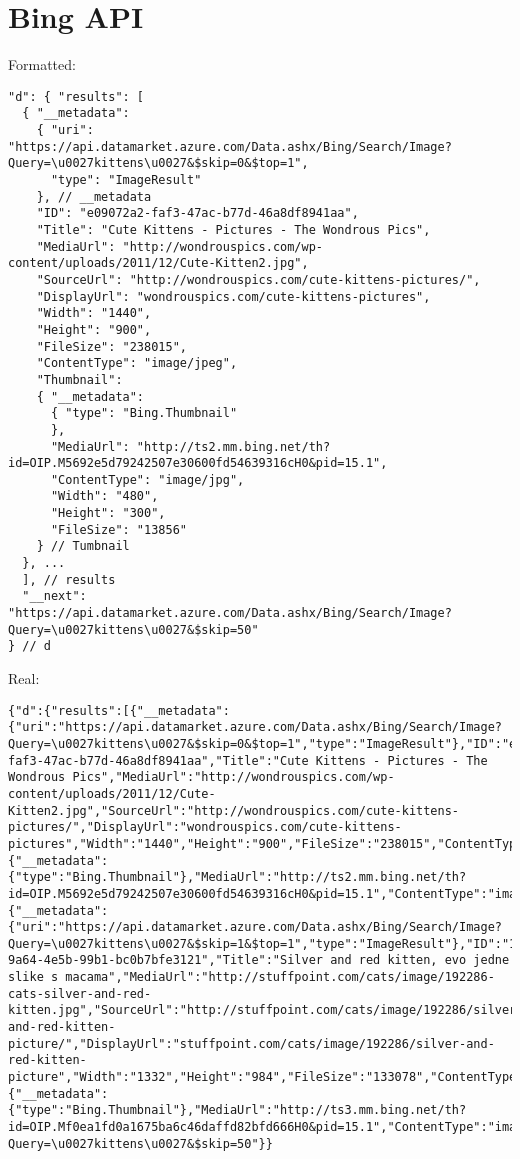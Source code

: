 \section{Bing API}

Formatted:
\begin{verbatim}
"d": { "results": [
  { "__metadata":
    { "uri": "https://api.datamarket.azure.com/Data.ashx/Bing/Search/Image?Query=\u0027kittens\u0027&$skip=0&$top=1",
      "type": "ImageResult"
    }, // __metadata
    "ID": "e09072a2-faf3-47ac-b77d-46a8df8941aa",
    "Title": "Cute Kittens - Pictures - The Wondrous Pics",
    "MediaUrl": "http://wondrouspics.com/wp-content/uploads/2011/12/Cute-Kitten2.jpg",
    "SourceUrl": "http://wondrouspics.com/cute-kittens-pictures/",
    "DisplayUrl": "wondrouspics.com/cute-kittens-pictures",
    "Width": "1440",
    "Height": "900",
    "FileSize": "238015",
    "ContentType": "image/jpeg",
    "Thumbnail":
    { "__metadata":
      { "type": "Bing.Thumbnail"
      },
      "MediaUrl": "http://ts2.mm.bing.net/th?id=OIP.M5692e5d79242507e30600fd54639316cH0&pid=15.1",
      "ContentType": "image/jpg",
      "Width": "480",
      "Height": "300",
      "FileSize": "13856"
    } // Tumbnail
  }, ...
  ], // results
  "__next": "https://api.datamarket.azure.com/Data.ashx/Bing/Search/Image?Query=\u0027kittens\u0027&$skip=50"
} // d
\end{verbatim}

Real:
\begin{verbatim}
{"d":{"results":[{"__metadata":{"uri":"https://api.datamarket.azure.com/Data.ashx/Bing/Search/Image?Query=\u0027kittens\u0027&$skip=0&$top=1","type":"ImageResult"},"ID":"e09072a2-faf3-47ac-b77d-46a8df8941aa","Title":"Cute Kittens - Pictures - The Wondrous Pics","MediaUrl":"http://wondrouspics.com/wp-content/uploads/2011/12/Cute-Kitten2.jpg","SourceUrl":"http://wondrouspics.com/cute-kittens-pictures/","DisplayUrl":"wondrouspics.com/cute-kittens-pictures","Width":"1440","Height":"900","FileSize":"238015","ContentType":"image/jpeg","Thumbnail":{"__metadata":{"type":"Bing.Thumbnail"},"MediaUrl":"http://ts2.mm.bing.net/th?id=OIP.M5692e5d79242507e30600fd54639316cH0&pid=15.1","ContentType":"image/jpg","Width":"480","Height":"300","FileSize":"13856"}},{"__metadata":{"uri":"https://api.datamarket.azure.com/Data.ashx/Bing/Search/Image?Query=\u0027kittens\u0027&$skip=1&$top=1","type":"ImageResult"},"ID":"16f74e1b-9a64-4e5b-99b1-bc0b7bfe3121","Title":"Silver and red kitten, evo jedne slike s macama","MediaUrl":"http://stuffpoint.com/cats/image/192286-cats-silver-and-red-kitten.jpg","SourceUrl":"http://stuffpoint.com/cats/image/192286/silver-and-red-kitten-picture/","DisplayUrl":"stuffpoint.com/cats/image/192286/silver-and-red-kitten-picture","Width":"1332","Height":"984","FileSize":"133078","ContentType":"image/jpeg","Thumbnail":{"__metadata":{"type":"Bing.Thumbnail"},"MediaUrl":"http://ts3.mm.bing.net/th?id=OIP.Mf0ea1fd0a1675ba6c46daffd82bfd666H0&pid=15.1","ContentType":"image/jpg","Width":"300","Height":"221","FileSize":"6509"}},...],"__next":"https://api.datamarket.azure.com/Data.ashx/Bing/Search/Image?Query=\u0027kittens\u0027&$skip=50"}}
\end{verbatim}

